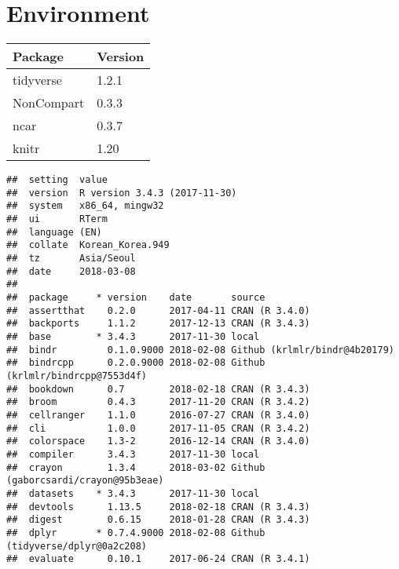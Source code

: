 \documentclass[12pt,]{krantz}
\theoremstyle{definition}
\theoremstyle{definition}
\theoremstyle{definition}
\theoremstyle{remark}
\begin{document}
\appendix {}


\chapter{Environment}\label{environment}

\begin{tabular}{l|l}
\hline
Package & Version\\
\hline
tidyverse & 1.2.1\\
\hline
NonCompart & 0.3.3\\
\hline
ncar & 0.3.7\\
\hline
knitr & 1.20\\
\hline
\end{tabular}

\begin{verbatim}
##  setting  value                       
##  version  R version 3.4.3 (2017-11-30)
##  system   x86_64, mingw32             
##  ui       RTerm                       
##  language (EN)                        
##  collate  Korean_Korea.949            
##  tz       Asia/Seoul                  
##  date     2018-03-08                  
## 
##  package     * version    date       source                              
##  assertthat    0.2.0      2017-04-11 CRAN (R 3.4.0)                      
##  backports     1.1.2      2017-12-13 CRAN (R 3.4.3)                      
##  base        * 3.4.3      2017-11-30 local                               
##  bindr         0.1.0.9000 2018-02-08 Github (krlmlr/bindr@4b20179)       
##  bindrcpp      0.2.0.9000 2018-02-08 Github (krlmlr/bindrcpp@7553d4f)    
##  bookdown      0.7        2018-02-18 CRAN (R 3.4.3)                      
##  broom         0.4.3      2017-11-20 CRAN (R 3.4.2)                      
##  cellranger    1.1.0      2016-07-27 CRAN (R 3.4.0)                      
##  cli           1.0.0      2017-11-05 CRAN (R 3.4.2)                      
##  colorspace    1.3-2      2016-12-14 CRAN (R 3.4.0)                      
##  compiler      3.4.3      2017-11-30 local                               
##  crayon        1.3.4      2018-03-02 Github (gaborcsardi/crayon@95b3eae) 
##  datasets    * 3.4.3      2017-11-30 local                               
##  devtools      1.13.5     2018-02-18 CRAN (R 3.4.3)                      
##  digest        0.6.15     2018-01-28 CRAN (R 3.4.3)                      
##  dplyr       * 0.7.4.9000 2018-02-08 Github (tidyverse/dplyr@0a2c208)    
##  evaluate      0.10.1     2017-06-24 CRAN (R 3.4.1)                      

\end{verbatim}
\end{document}
